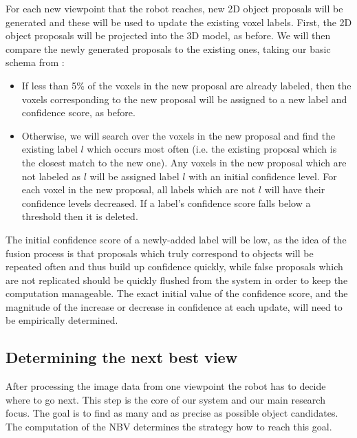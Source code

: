 \documentclass[a4paper,11pt,english]{article}
\begin{document}
For each new viewpoint that the robot reaches, new 2D object proposals will be generated and these will be used to update the existing voxel labels.
First, the 2D object proposals will be projected into the 3D model, as before.
We will then compare the newly generated proposals to the existing ones, taking our basic schema from \cite{garcia2013computational}:

\begin{itemize}
	\item If less than 5\% of the voxels in the new proposal are already labeled, then the voxels corresponding to the new proposal will be assigned to a new label and confidence score, as before.
	\item Otherwise, we will search over the voxels in the new proposal and find the existing label \(l\) which occurs most often (i.e. the existing proposal which is the closest match to the new one).
	Any voxels in the new proposal which are not labeled as \(l\) will be assigned label \(l\) with an initial confidence level.
	For each voxel in the new proposal, all labels which are not \(l\) will have their confidence levels decreased.
	If a label's confidence score falls below a threshold then it is deleted.
\end{itemize}

The initial confidence score of a newly-added label will be low, as the idea of the fusion process is that proposals which truly correspond to objects will be repeated often and thus build up confidence quickly, while false proposals which are not replicated should be quickly flushed from the system in order to keep the computation manageable.
The exact initial value of the confidence score, and the magnitude of the increase or decrease in confidence at each update, will need to be empirically determined.

\subsection{Determining the next best view}
\label{system:nbv}
After processing the image data from one viewpoint the robot has to decide where to go next.
This step is the core of our system and our main research focus.
The goal is to find as many and as precise as possible object candidates.
The computation of the NBV determines the strategy how to reach this goal.
\end{document}
